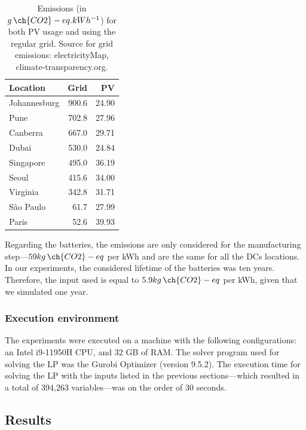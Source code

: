 \begin{table}[h]

  \caption{Emissions (in $g\,\ch{CO2}-eq.kWh^{-1}$) for both PV usage and using the regular grid. Source for grid emissions: electricityMap, climate-transparency.org.}\label{tab:carbonfootprint} \centering
  \begin{tabular}{|l|r|r|}
    
  \hline
    
  \textbf{Location} &  \textbf{Grid} & \textbf{PV} \\
  \hline
  Johannesburg & 900.6 & 24.90 \\
  \hline
  Pune & 702.8 & 27.96 \\
  \hline
  Canberra & 667.0 & 29.71 \\
  \hline
  Dubai & 530.0  & 24.84 \\
  \hline
  Singapore & 495.0 & 36.19 \\
  \hline     
  Seoul & 415.6 & 34.00 \\
  \hline
  Virginia  & 342.8 & 31.71 \\
  \hline
  São Paulo &  61.7 & 27.99\\
  \hline 
  Paris &  52.6  & 39.93 \\
  \hline  

\end{tabular}  
\end{table}

Regarding the batteries, the emissions are only considered for the manufacturing step---$59 kg\,\ch{CO2}-eq$ per kWh and are the same for all the DCs locations. In our experiments, the considered lifetime of the batteries was ten years. Therefore, the input used is equal to $5.9 kg\,\ch{CO2}-eq$ per kWh, given that we simulated one year.

\subsubsection{Execution environment}
 
The experiments were executed on a machine with the following configurations: an Intel i9-11950H CPU, and 32 GB of RAM. The solver program used for solving the LP was the Gurobi Optimizer (version 9.5.2). The execution time for solving the LP with the inputs listed in the previous sections---which resulted in a total of 394,263 variables---was on the order of 30 seconds.

\subsection{Results}

